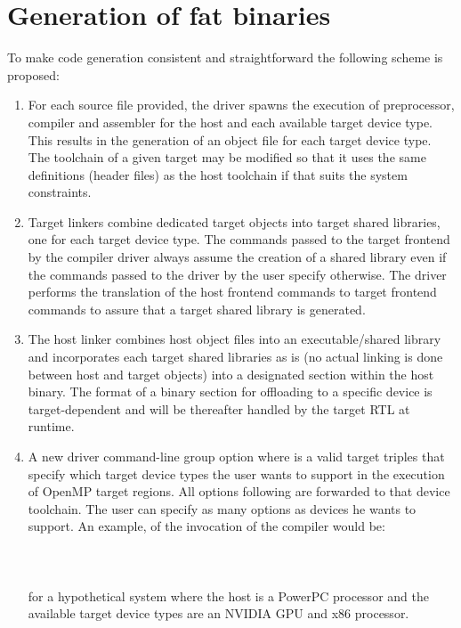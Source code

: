 \section{Generation of fat binaries}

To make code generation consistent and straightforward the following scheme is proposed: 
\begin{enumerate}
  \item For each source file provided, the driver spawns the execution of preprocessor, compiler and assembler for the host and each available target device type. This results in the generation of an object file for each target device type. The toolchain of a given target may be modified so that it uses the same definitions (header files) as the host toolchain if that suits the system constraints.

  \item Target linkers combine dedicated target objects into target shared libraries, one for each target device type. The commands passed to the target frontend by the compiler driver always assume the creation of a shared library even if the commands passed to the driver by the user specify otherwise. The driver performs the translation of the host frontend commands to target frontend commands to assure that a target shared library is generated.

  \item The host linker combines host object files into an executable/shared library and incorporates each target shared libraries as is (no actual linking is done between host and target objects) into a designated section within the host binary. The format of a binary section for offloading to a specific device is target-dependent and will be thereafter handled by the target RTL at runtime.

  \item A new driver command-line group option  where  is a valid target triples that specify which target device types the user wants to support in the execution of OpenMP target regions. All options following  are forwarded to that device toolchain. The user can specify as many  options as devices he wants to support. An example, of the invocation of the compiler would be:
  \\ ~ \\
  \\ ~ \\
  for a hypothetical system where the host is a PowerPC processor and the available target device types are an NVIDIA GPU and x86 processor.


\end{enumerate}
